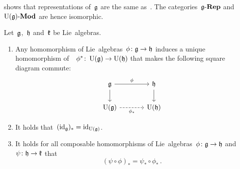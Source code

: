 \begin{remark}
   shows that representations of~$\mathfrak{g}$ are the same as~{\modules{$\Univ(\glie)$}}.
  The categories~$\mathfrak{g}\text{-}\mathbf{Rep}$ and~$\operatorname{U}(\mathfrak{g})\text{-}\mathbf{Mod}$ are hence isomorphic.
\end{remark}


\begin{lemma}
  \label{functoriality of universal enveloping algebra}
  Let~$\mathfrak{g}$,~$\mathfrak{h}$ and~$\mathfrak{k}$ be Lie~algebras.
  \begin{enumerate}
    \item
      Any homomorphism of Lie~algebras~$\phi \colon \mathfrak{g} \to \mathfrak{h}$ induces a unique homomorphism of~\algebras{$\kf$}~$\phi^* \colon \operatorname{U}(\mathfrak{g}) \to \operatorname{U}(\mathfrak{h})$ that makes the following square diagram commute:
      \[
        \begin{tikzcd}[column sep = large]
          \glie
          \arrow{r}[above]{\phi}
          \arrow{d}
          &
          \hlie
          \arrow{d}
          \\
          \Univ(\glie)
          \arrow[dashed]{r}[below]{\phi_*}
          &
          \Univ(\hlie)
        \end{tikzcd}
      \]
    \item
      It holds that~$(\operatorname{id}_{\mathfrak{g}})_* = \operatorname{id}_{\operatorname{U}(\mathfrak{g})}$.
    \item
      It holds for all composable homomorphisms of Lie~algebras~$\phi \colon \mathfrak{g} \to \mathfrak{h}$ and~$\psi \colon \mathfrak{h} \to \mathfrak{k}$ that
      \[
        (\psi \circ \phi)_*
        =
        \psi_* \circ \phi_* \,.
      \]
  \end{enumerate}
\end{lemma}


